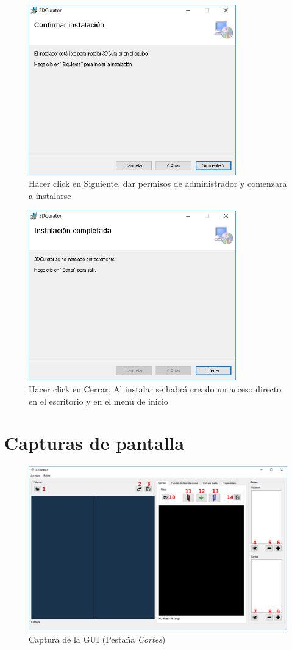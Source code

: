 \begin{figure}[H]
	\centering
	\includegraphics[width=9cm]{imagenes/instalacion_3}
	\caption{Hacer click en Siguiente, dar permisos de administrador y comenzará a instalarse}
	\label{fig:instalacion_3}
\end{figure}

\begin{figure}[H]
	\centering
	\includegraphics[width=9cm]{imagenes/instalacion_4}
	\caption{Hacer click en Cerrar. Al instalar se habrá creado un acceso directo en el escritorio y en el menú de inicio}
	\label{fig:instalacion_4}
\end{figure}

\section{Capturas de pantalla}

\begin{figure}[H]
	\centering
	\includegraphics[width=12.5cm]{imagenes/gui_1}
	\caption{Captura de la GUI (Pestaña \textit{Cortes})}
	\label{fig:gui_1}
\end{figure}

